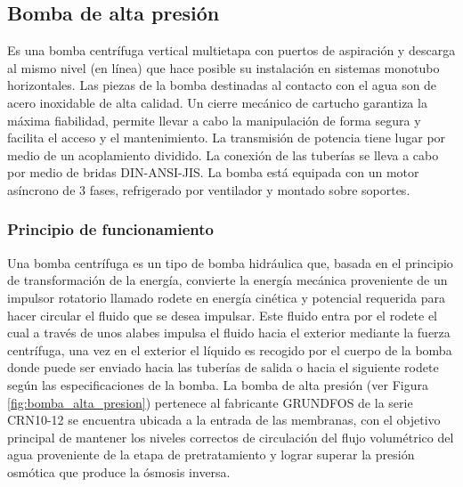 \subsection{Bomba de alta presión}

Es una bomba centrífuga vertical multietapa con puertos de aspiración y
descarga al mismo nivel (en línea) que hace posible su instalación en sistemas
monotubo horizontales. Las piezas de la bomba destinadas al contacto con el
agua son de acero inoxidable de alta calidad. Un cierre mecánico de cartucho
garantiza la máxima fiabilidad, permite llevar a cabo la manipulación de forma
segura y facilita el acceso y el mantenimiento. La transmisión de potencia tiene
lugar por medio de un acoplamiento dividido. La conexión de las tuberías se lleva
a cabo por medio de bridas DIN-ANSI-JIS. La bomba está equipada con un motor
asíncrono de 3 fases, refrigerado por ventilador y montado sobre soportes.\\

\subsubsection*{Principio de funcionamiento}

Una bomba centrífuga es un tipo de bomba hidráulica que, basada en el
principio de transformación de la energía, convierte la energía mecánica
proveniente de un impulsor rotatorio llamado rodete en energía cinética y
potencial requerida para hacer circular el fluido que se desea impulsar. Este
fluido entra por el rodete el cual a través de unos alabes impulsa el fluido hacia
el exterior mediante la fuerza centrífuga, una vez en el exterior el líquido es
recogido por el cuerpo de la bomba donde puede ser enviado hacia las tuberías
de salida o hacia el siguiente rodete según las especificaciones de la bomba.
La bomba de alta presión (ver Figura \ref{fig:bomba_alta_presion}) pertenece al fabricante
GRUNDFOS de la serie CRN10-12 se encuentra ubicada a la entrada de las
membranas, con el objetivo principal de mantener los niveles correctos de
circulación del flujo volumétrico del agua proveniente de la etapa de
pretratamiento y lograr superar la presión osmótica que produce la ósmosis
inversa.\\


